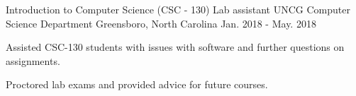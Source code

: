 \begin{cventries}
  \cventry
    {Introduction to Computer Science (CSC - 130) Lab assistant} %
    {UNCG Computer Science Department} %
    {Greensboro, North Carolina} %
    {Jan. 2018 - May. 2018} %
    {
      \begin{cvitems} %
        \item {Assisted CSC-130 students with issues with software and further questions on assignments.}
        \item {Proctored lab exams and provided advice for future courses.}
      \end{cvitems}
    }



\end{cventries}
